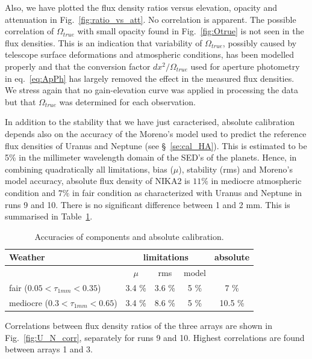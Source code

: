 Also, we have plotted the flux density ratios versus elevation, opacity and attenuation in  Fig.~\ref{fig:ratio_vs_att}.
No correlation is apparent. The possible correlation of $\Omega_{true}$ with small opacity found in Fig.~\ref{fig:Otrue}
is not seen in the flux densities. This is an indication that variability of $\Omega_{true}$, possibly 
caused by telescope surface deformations and atmospheric conditions,
has been modelled properly and  that the conversion factor
$dx^2/\Omega_{true}$ used for aperture photometry in eq.~\ref{eq:ApPh}
has largely removed the effect in the measured flux densities. 
We stress again that no gain-elevation curve was applied
in processing the data but that  $\Omega_{true}$ was determined for each observation.

In addition to the stability that we
have just caracterised, absolute calibration depends also on the
accuracy of the Moreno's model used to  predict the reference flux
densities of Uranus and Neptune (see \S~\ref{se:cal_HA}).    
This  is estimated to be 5\% in the millimeter wavelength domain of the SED's of the planets.
Hence, in combining quadratically all limitations, bias ($\mu$), stability (rms) and  Moreno's model accuracy, absolute flux density
of NIKA2 is $11\%$ in mediocre atmospheric
condition and  $7\%$ in fair condition as characterized with Uranus
and Neptune in runs 9 and 10. There is no significant difference
between 1 and 2 mm. This is summarised in Table~\ref{tab:cal_tot}.



\begin{table}[h]
\begin{center}
\begin{tabular}{|l|c|c|c|c|}
\hline
Weather  & \multicolumn{3}{|c|}{limitations} & absolute  \\
\hline
                &    $\mu$       &   rms   &    model  &    \\
\hline
 fair  ($0.05 < \tau_{1mm} < 0.35$)                      &       3.4 \%    &      3.6 \%   &    5 \%       &   7 \%    \\
 mediocre     ($0.3 < \tau_{1mm} < 0.65$)              &       3.4 \%    &      8.6 \%   &    5 \%      &  10.5 \%    \\
\hline
\end{tabular}
\caption[]{Accuracies of components and absolute calibration.}
\label{tab:cal_tot}
\end{center}
\end{table}


Correlations between flux density ratios of the three arrays are shown in Fig.~\ref{fig:U_N_corr}, separately
for runs 9 and  10. Highest correlations are found between arrays 1 and 3.

